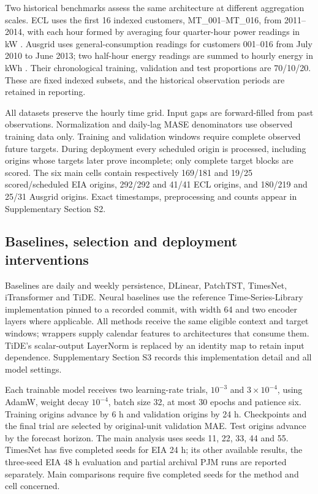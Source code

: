 \documentclass[final,5p,times]{elsarticle}
\begin{document}
Two historical benchmarks assess the same architecture at different aggregation scales. ECL uses the first 16 indexed customers, MT\_001--MT\_016, from 2011--2014, with each hour formed by averaging four quarter-hour power readings in kW \cite{uci2015ecl}. Ausgrid uses general-consumption readings for customers 001--016 from July 2010 to June 2013; two half-hour energy readings are summed to hourly energy in kWh \cite{ratnam2015ausgrid}. Their chronological training, validation and test proportions are 70/10/20. These are fixed indexed subsets, and the historical observation periods are retained in reporting.

All datasets preserve the hourly time grid. Input gaps are forward-filled from past observations. Normalization and daily-lag MASE denominators use observed training data only. Training and validation windows require complete observed future targets. During deployment every scheduled origin is processed, including origins whose targets later prove incomplete; only complete target blocks are scored. The six main cells contain respectively 169/181 and 19/25 scored/scheduled EIA origins, 292/292 and 41/41 ECL origins, and 180/219 and 25/31 Ausgrid origins. Exact timestamps, preprocessing and counts appear in Supplementary Section S2.

\subsection{Baselines, selection and deployment interventions}
Baselines are daily and weekly persistence, DLinear, PatchTST, TimesNet, iTransformer and TiDE. Neural baselines use the reference Time-Series-Library implementation pinned to a recorded commit, with width 64 and two encoder layers where applicable. All methods receive the same eligible context and target windows; wrappers supply calendar features to architectures that consume them. TiDE's scalar-output LayerNorm is replaced by an identity map to retain input dependence. Supplementary Section S3 records this implementation detail and all model settings.

Each trainable model receives two learning-rate trials, $10^{-3}$ and $3\times10^{-4}$, using AdamW, weight decay $10^{-4}$, batch size 32, at most 30 epochs and patience six. Training origins advance by 6 h and validation origins by 24 h. Checkpoints and the final trial are selected by original-unit validation MAE. Test origins advance by the forecast horizon. The main analysis uses seeds 11, 22, 33, 44 and 55. TimesNet has five completed seeds for EIA 24 h; its other available results, the three-seed EIA 48 h evaluation and partial archival PJM runs are reported separately. Main comparisons require five completed seeds for the method and cell concerned.
\end{document}
